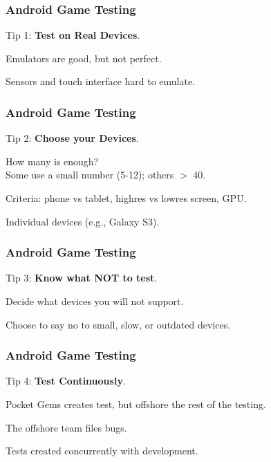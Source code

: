 \begin{frame}
\frametitle{Android Game Testing}
\begin{changemargin}{1cm}

Tip 1: \textbf{Test on Real Devices}.

Emulators are good, but not perfect.

Sensors and touch interface hard to emulate.

\end{changemargin}
\end{frame}

\begin{frame}
\frametitle{Android Game Testing}
\begin{changemargin}{1cm}

Tip 2: \textbf{Choose your Devices}.

How many is enough? \\
\quad Some use a small number (5-12); others $>$ 40.

Criteria: phone vs tablet, highres vs lowres screen, GPU.

Individual devices (e.g., Galaxy S3).

\end{changemargin}
\end{frame}

\begin{frame}
\frametitle{Android Game Testing}
\begin{changemargin}{1cm}

Tip 3: \textbf{Know what NOT to test}.

Decide what devices you will not support.

Choose to say no to small, slow, or outdated devices. 

\end{changemargin}
\end{frame}

\begin{frame}
\frametitle{Android Game Testing}
\begin{changemargin}{1cm}

Tip 4: \textbf{Test Continuously}.

Pocket Gems creates test, but offshore the rest of the testing.

The offshore team files bugs.

Tests created concurrently with development.

\end{changemargin}
\end{frame}


